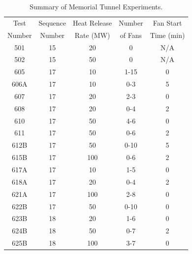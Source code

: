 \begin{table}[!ht]
\caption[Summary of Memorial Tunnel Experiments]{Summary of Memorial Tunnel Experiments.}
\begin{center}
\begin{tabular}{|c|c|c|c|c|}
\hline
Test     & Sequence & Heat Release  & Number   & Fan Start   \\ 
Number   & Number   & Rate (MW)     & of Fans  & Time (min)  \\ \hline \hline
501      & 15       & 20            & 0        & N/A         \\ \hline
502      & 15       & 50            & 0        & N/A         \\ \hline
605      & 17       & 10            & 1-15     & 0           \\ \hline
606A     & 17       & 10            & 0-3      & 5           \\ \hline
607      & 17       & 20            & 2-3      & 0           \\ \hline
608      & 17       & 20            & 0-4      & 2           \\ \hline
610      & 17       & 50            & 4-6      & 0           \\ \hline
611      & 17       & 50            & 0-6      & 2           \\ \hline
612B     & 17       & 50            & 0-10     & 5           \\ \hline
615B     & 17       & 100           & 0-6      & 2           \\ \hline
617A     & 17       & 10            & 1-5      & 0           \\ \hline
618A     & 17       & 20            & 0-4      & 2           \\ \hline
621A     & 17       & 100           & 2-8      & 0           \\ \hline
622B     & 17       & 50            & 0-10     & 0           \\ \hline
623B     & 18       & 20            & 1-6      & 0           \\ \hline
624B     & 18       & 50            & 0-7      & 2           \\ \hline
625B     & 18       & 100           & 3-7      & 0           \\ \hline
\end{tabular}
\end{center}
\label{tab:Memorial_Test_Matrix}
\end{table}



